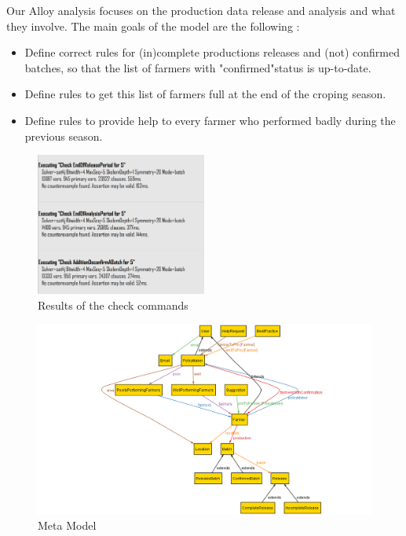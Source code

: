 Our Alloy analysis focuses on the production data release and analysis and what they involve. The main goals of the model are the following : 
\begin{itemize}[label=\textbullet]
	\item Define correct rules for (in)complete productions releases and (not) confirmed batches, so that the list of farmers with "confirmed"status is up-to-date.
	\item Define rules to get this list of farmers full at the end of the croping season.
	\item Define rules to provide help to every farmer who performed badly during the previous season.
\end{itemize}




\begin{figure} [!h]
	\centering
	\includegraphics[width=0.5\textwidth]{Images/alloy-check-results.png}
	\caption{\label{fig:seq} Results of the check commands}
\end{figure}

\begin{figure} [!h]
	\centering
	\includegraphics[width=1.2\textwidth]{Images/alloy-metamodel.png}
	\caption{\label{fig:seq} Meta Model}
\end{figure}